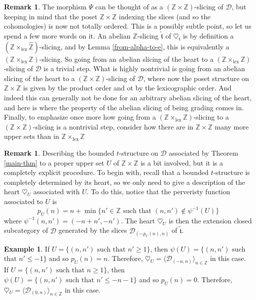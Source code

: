 \documentclass{article}
\theoremstyle{definition}
\newtheorem{exmp}[thm]{Example}
\newtheorem{rem}[thm]{Remark}
\newcommand{\Z}{\mathbb{Z}}
\newcommand{\tee}{\mathfrak{t}}
\begin{document}
\begin{rem}
The morphism $\Psi$ can be thought of as a $(\Z\times \Z)$-slicing of $\mathscr{D}$, but keeping in mind that the poset $\Z\times\Z$ indexing the slices (and so the cohomologies) is now not totally ordered. This is a possibly subtle point, so let us spend a few more words on it. An abelian $\mathbb{Z}$-slicing $\tilde{\tee}$ of $\heartsuit_\tee$ is by definition a $(\Z\times_{\mathrm{lex}}\hat{\Z})$-slicing, and by Lemma \ref{from-alpha-to-e}, this is equivalently a $(\Z\times_{\mathrm{lex}}{\Z})$-slicing. So going from an abelian slicing of the heart to a  $(\Z\times_{\mathrm{lex}}{\Z})$-slicing of $\mathscr{D}$ is a trivial step. What is highly nontrivial is going from an abelian slicing of the heart to a $(\Z\times{\Z})$-slicing of $\mathscr{D}$, where now the poset structure on $\Z\times \Z$ is given by the product order and ot by the lexicographic order. And indeed this can generally not be done for an 
arbitrary abelian slicing of the heart, and here is where the property of the abelian slicing of being grading comes in. Finally, to emphasize once more how going from a   $(\Z\times_{\mathrm{lex}}{\Z})$-slicing to a $(\Z\times{\Z})$-slicing is a nontrivial step, consider how there are in $\Z\times{\Z}$ many more upper sets than in $\Z\times_{\mathrm{lex}}{\Z}$
\end{rem}
\begin{rem}
Describing the bounded $t$-structure on $\mathscr{D}$ associated by Theorem \ref{main-thm} to a proper upper set $U$ of $\Z\times \Z$ is a bit involved, but it is a completely explicit procedure. To begin with, recall that a bounded $t$-structure is completely determined by its heart, so we only need to give a description of the heart $\heartsuit_U$ associated with $U$. To do this, notice that the perveristy function associated to $U$ is
\[
p_U(n)=n+\min\{n'\in \Z\text{ such that } (n,n')\notin \psi^{-1}(U)\} 
\]
where $\psi^{-1}(n,n')=(-n+n',-n')$. The heart $\heartsuit_U$ is then the extension closed subcategory of $\mathscr{D}$ generated by the slices $\mathscr{D}_{(-p_U(n),n)}$ of $\tilde{\tee}$.
\end{rem}
\begin{exmp}
If $U=\{(n,n')\text{ such that } n'\geq 1\}$, then $\psi(U)=\{(n,n')\text{ such}$ $\text{that } n'\leq -1\}$ and so $p_U(n)=n$. Therefore, $\heartsuit_U=\langle \mathscr{D}_{(-n,n)}\rangle_{n\in \Z}$ in this case. If $U=\{(n,n')\text{ such that } n\geq 1\}$, then $\psi(U)=\{(n,n')\text{ such that } n'\leq -n-1\}$ and so $p_U(n)=0$. Therefore, $\heartsuit_U=\langle \mathscr{D}_{(0,n)}\rangle_{n\in \Z}$ in this case.
\end{exmp}
\end{document}
